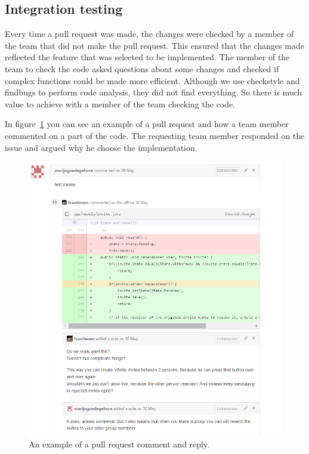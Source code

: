 \subsection{Integration testing}
\label{sec:integration}
Every time a pull request was made, the changes were checked by a member of the team that did not make the pull request.
This ensured that the changes made reflected the feature that was selected to be implemented.
The member of the team to check the code asked questions about some changes and checked if complex functions could be made more efficient.
Although we use checkstyle and findbugs to perform code analysis, they did not find everything.
So there is much value to achieve with a member of the team checking the code.

In figure~\ref{pullrequest-example} you can see an example of a pull request and how a team member commented on a part of the code.
The requesting team member responded on the issue and argued why he choose the implementation.

\begin{figure}[H]
    \centering
    \includegraphics[width=\textwidth]{images/pullrequest-example1}
    \caption{An example of a pull request comment and reply.}
    \label{pullrequest-example}
\end{figure}

